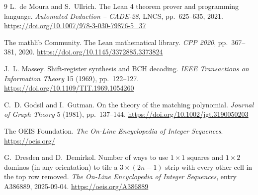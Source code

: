 \documentclass[11pt]{article}
\theoremstyle{definition}
\begin{document}
\begin{thebibliography}{9}
L.~de Moura and S.~Ullrich.
\newblock The Lean 4 theorem prover and programming language.
\newblock \emph{Automated Deduction -- CADE-28}, LNCS, pp.~625--635, 2021.
\url{https://doi.org/10.1007/978-3-030-79876-5_37}

The mathlib Community.
\newblock The Lean mathematical library.
\newblock \emph{CPP 2020}, pp.~367--381, 2020.
\url{https://doi.org/10.1145/3372885.3373824}

J.~L. Massey.
\newblock Shift-register synthesis and BCH decoding.
\newblock \emph{IEEE Transactions on Information Theory} 15 (1969),
pp.~122--127.
\url{https://doi.org/10.1109/TIT.1969.1054260}

C.~D. Godsil and I.~Gutman.
\newblock On the theory of the matching polynomial.
\newblock \emph{Journal of Graph Theory} 5 (1981), pp.~137--144.
\url{https://doi.org/10.1002/jgt.3190050203}

The OEIS Foundation.
\newblock \emph{The On-Line Encyclopedia of Integer Sequences}.
\newblock \url{https://oeis.org/}

G.~Dresden and D.~Demirkol.
\newblock Number of ways to use $1\times1$ squares and $1\times2$ dominos (in
any orientation) to tile a $3\times(2n-1)$ strip with every other cell in the
top row removed.
\newblock \emph{The On-Line Encyclopedia of Integer Sequences}, entry A386889,
2025-09-04.
\url{https://oeis.org/A386889}
\end{thebibliography}
\end{document}
